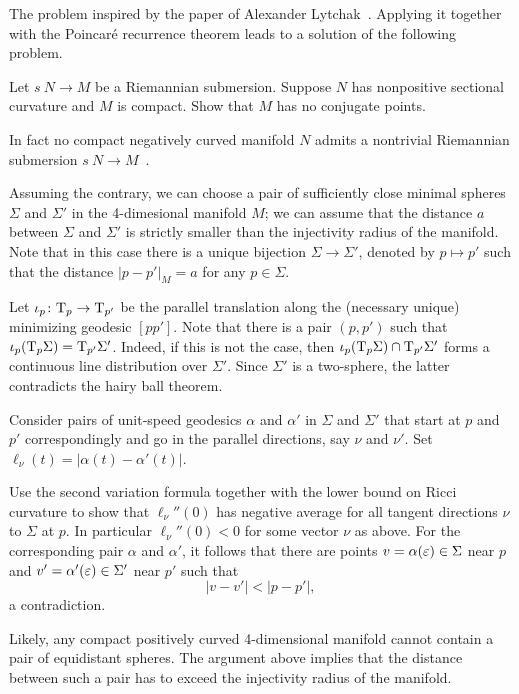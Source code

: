 The problem inspired by the paper of Alexander Lytchak~\cite{lytchak:conjugate}.
Applying it together with the Poincar\'e recurrence theorem
leads to a solution of the following problem.

\begin{pr}
Let $s\:N\to M$ be a Riemannian submersion.
Suppose $N$ has nonpositive sectional curvature and $M$ is compact.
Show that $M$ has no conjugate points.
\end{pr}

In fact no compact negatively curved manifold $N$ admits a nontrivial Riemannian submersion $s\:N\to M$~\cite[see Theorem F in][]{zeghib}. 





Assuming the contrary,
we can choose a pair of sufficiently close minimal spheres $\Sigma$ and $\Sigma'$ in the 4-dimesional manifold $M$;
we can assume that the distance $a$ between $\Sigma$ and $\Sigma'$ is strictly smaller than the injectivity radius of the manifold.
Note that in this case there is a unique bijection $\Sigma\to \Sigma'$, denoted by $p\mapsto p'$ such that the distance $|p-p'|_M=a$ for any $p\in\Sigma$.

Let $\iota_p\colon\mathrm{T}_p\to\mathrm{T}_{p'}$ be the parallel translation along the (necessary unique) minimizing geodesic $[pp']$.
Note that there is a pair $(p,p')$ such that $\iota_p(\mathrm{T}_p\Sigma)=\mathrm{T}_{p'}\Sigma'$.
Indeed, if this is not the case, then $\iota_p(\T_p\Sigma)\z\cap\T_{p'}\Sigma'$ forms a continuous line distribution over $\Sigma'$.
Since $\Sigma'$ is a two-sphere, the latter contradicts the hairy ball theorem.

Consider pairs of unit-speed geodesics $\alpha$ and $\alpha'$ 
in $\Sigma$ and $\Sigma'$  
that start at $p$ and $p'$ correspondingly
and go in the parallel directions, say $\nu$ and $\nu'$. %
Set $\ell_\nu(t)=|\alpha(t)-\alpha'(t)|$.

Use the second variation formula together with the lower bound on Ricci curvature
to show that $\ell_\nu''(0)$ has negative average for all tangent directions $\nu$ to $\Sigma$ at $p$. 
In particular $\ell_\nu''(0)<0$ for some vector $\nu$ as above.
For the corresponding pair $\alpha$ and $\alpha'$,
it follows that there are points $v=\alpha(\varepsilon)\in\Sigma$ near $p$ 
and $v'=\alpha'(\varepsilon)\in\Sigma'$ near $p'$
such that 
\[|v-v'|<|p-p'|,\]
a contradiction.\qeds

Likely, any compact positively curved 
4-dimensional manifold
cannot contain a pair of equidistant spheres.
The argument above implies that the distance between such a pair has to exceed the injectivity radius of the manifold.


